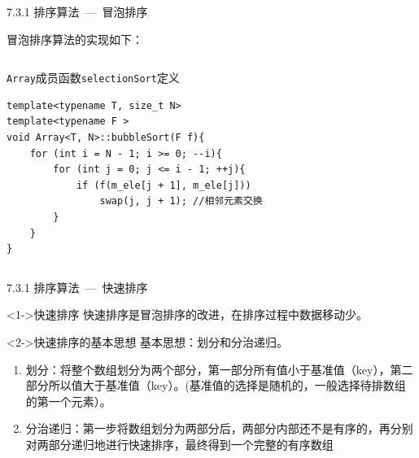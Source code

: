 
\begin{frame}[fragile]{7.3.1 排序算法\normalsize{~---~冒泡排序}}

冒泡排序算法的实现如下：

\vspace{-4mm}

\begin{columns}[t]

\begin{blueblock}{\texttt{Array}成员函数\texttt{selectionSort}定义}
\begin{lstlisting}[moreemph={Array,T,F}]
template<typename T, size_t N>
template<typename F >
void Array<T, N>::bubbleSort(F f){
    for (int i = N - 1; i >= 0; --i){
        for (int j = 0; j <= i - 1; ++j){
            if (f(m_ele[j + 1], m_ele[j]))
                swap(j, j + 1); //相邻元素交换
        }
    }
}
\end{lstlisting}
\end{blueblock}


\end{columns}

\end{frame}


\begin{frame}[fragile]{7.3.1 排序算法\normalsize{~---~快速排序}}

\begin{block}<1->{快速排序}
 快速排序是冒泡排序的改进，在排序过程中数据移动少。\\
\end{block}
\begin{block}<2->{快速排序的基本思想}
基本思想：划分和分治递归。\\
   \begin{enumerate}
     \item 划分：将整个数组划分为两个部分，第一部分所有值小于基准值（key），第二部分所以值大于基准值（key）。(基准值的选择是随机的，一般选择待排数组的第一个元素）。
     \item 分治递归：第一步将数组划分为两部分后，两部分内部还不是有序的，再分别对两部分递归地进行快速排序，最终得到一个完整的有序数组
   \end{enumerate}
\end{block}
\end{frame}

